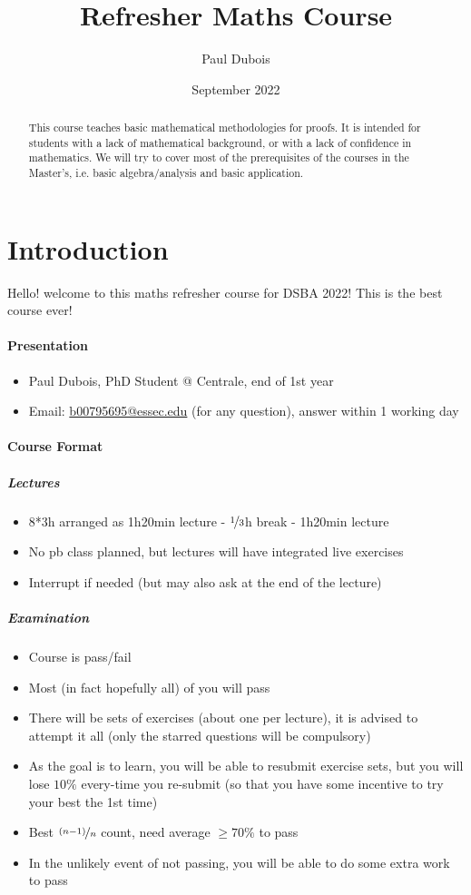 \documentclass[11pt,a4paper]{article}
\title{Refresher Maths Course}
\author{Paul Dubois}
\date{September 2022}
\begin{document}
\maketitle
\begin{abstract}
    This course teaches basic mathematical methodologies for proofs.
    It is intended for students with a lack of mathematical background, or with a lack of confidence in mathematics.
    We will try to cover most of the prerequisites of the courses in the Master’s, i.e. basic algebra/analysis and basic application.
\end{abstract}
\tableofcontents
\newpage

\setcounter{section}{-1}
\section{Introduction}
Hello! welcome to this maths refresher course for DSBA 2022! This is the best course ever!
\paragraph{Presentation}
\begin{itemize}
    \item Paul Dubois, PhD Student @ Centrale, end of 1st year
    \item Email: \href{mailto:b00795695@essec.edu}{b00795695@essec.edu} (for any question), answer within 1 working day
\end{itemize}
\paragraph{Course Format}
\subparagraph{Lectures}
\begin{itemize}
    \item 8*3h arranged as 1h20min lecture - $\nicefrac{1}{3}$h break - 1h20min lecture
    \item No pb class planned, but lectures will have integrated live exercises
    \item Interrupt if needed (but may also ask at the end of the lecture)
\end{itemize}
\subparagraph{Examination}
\begin{itemize}
    \item Course is pass/fail
    \item Most (in fact hopefully all) of you will pass
    \item There will be sets of exercises (about one per lecture), it is advised to attempt it all (only the starred questions will be compulsory)
    \item As the goal is to learn, you will be able to resubmit exercise sets, but you will lose $10\%$ every-time you re-submit (so that you have some incentive to try your best the 1st time)
    \item Best $\nicefrac{(n-1)}{n}$ count, need average $\geq 70 \%$ to pass
    \item In the unlikely event of not passing, you will be able to do some extra work to pass
\end{itemize}
\end{document}

